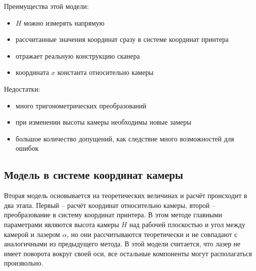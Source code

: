             Преимущества этой модели:
            \begin{itemize}
                \item $ H $ можно измерять напрямую
                \item рассчитанные значения координат сразу в системе координат принтера
                \item отражает реальную конструкцию сканера
                \item координата $ x $ константа относительно камеры
            \end{itemize}
            
            Недостатки:
            \begin{itemize}
                \item много тригонометрических преобразований
                \item при изменении высоты камеры необходимы новые замеры
                \item большое количество допущений, как следствие много возможностей для ошибок
            \end{itemize}

        \subsection{Модель в системе координат камеры}
            Вторая модель основывается на теоретических величинах и расчёт происходит в два этапа. Первый -- расчёт координат относительно камеры, второй -- преобразование в систему координат принтера. В этом методе главными параметрами являются высота камеры $ H $ над рабочей плоскостью и угол между камерой и лазером $ \alpha $, но они рассчитываются теоретически и не совпадают с аналогичными из предыдущего метода. В этой модели считается, что лазер не имеет поворота вокруг своей оси, все остальные компоненты могут располагаться произвольно.
            
